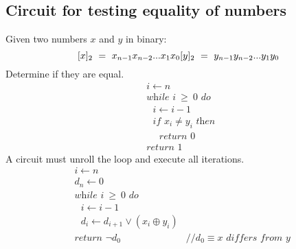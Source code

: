 \documentclass{report}
\begin{document}
\begin{adjustwidth}{2em}{2em}
	\subsection{Circuit for testing equality of numbers}
	\begin{adjustwidth}{2em}{}
		Given two numbers $x$ and $y$ in binary:
		\[
			[x]_2 \ = \ x_{n-1}x_{n-2}...x_1x_0 $$$$
			[y]_2 \ = \ y_{n-1}y_{n-2}...y_1y_0
		\]
		Determine if they are equal.
		\begin{align*}
			& i \leftarrow n \\
			& \textit{while } i \ \geq \ 0 \textit{ do} \\
			& \ \ \ i \leftarrow i-1 \\
			& \ \ \ \textit{if } x_i \neq y_i \textit{ then } \\
			& \ \ \ \ \ \ \textit{return } 0 \\
			& \textit{return } 1
		\end{align*}
		A circuit must unroll the loop and execute all iterations.
		\begin{align*}
			& i \leftarrow n \\
			& d_n \leftarrow  0 \\
			& \textit{while } i \ \geq \ 0 \textit{ do} \\
			& \ \ \ i \leftarrow i-1 \\
			& \ \ \ d_i \leftarrow d_{i+1} \vee (x_i \oplus y_i) \\
			& \textit{return } \neg d_0 & // d_0 \equiv x \textit{ differs from } y
		\end{align*}
		\begin{tikzpicture}
		\end{tikzpicture}
	\end{adjustwidth}
\end{adjustwidth}
\end{document}
